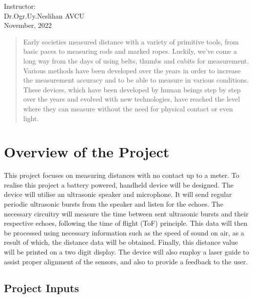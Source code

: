 \documentclass[12pt, a4paper]{article}
\begin{document}
\begin{titlepage}
\begin{center}
            Instructor:\\ Dr.Ogr.Uy.Neslihan AVCU\\

            \vspace*{1 cm}
            November, 2022


        \end{center}

    \end{titlepage}

    \pagebreak
    
    \tableofcontents

    \pagebreak

    \begin{abstract}
        Early societies measured distance with a variety of primitive tools, from basic paces to measuring rods and marked ropes.\cite{abstract} Luckily, we’ve come a long way from the days of using belts, thumbs and cubits for measurement. Various methods have been developed over the years in order to increase the measurement accuracy and to be able to measure in various conditions. These devices, which have been developed by human beings step by step over the years and evolved with new technologies, have reached the level where they can measure without the need for physical contact or even light.
    \end{abstract}

    \section{Overview of the Project}

        This project focuses on measuring distances with no contact up to a meter. To realise this project a battery powered, handheld device will be designed. The device will utilise an ultrasonic speaker and microphone. It will send regular periodic ultrasonic bursts from the speaker and listen for the echoes. The necessary circuitry will measure the time between sent ultrasonic bursts and their respective echoes, following the time of flight (ToF) principle. This data will then be processed using necessary information such as the speed of sound on air, as a result of which, the distance data will be obtained. Finally, this distance value will be printed on a two digit display. The device will also employ a laser guide to assist proper alignment of the sensors, and also to provide a feedback to the user. 


        \subsection{Project Inputs}
\end{document}
